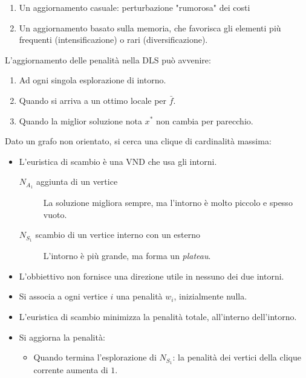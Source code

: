 \documentclass[\main/main.tex]{subfiles}
\begin{document}
\begin{multicols}{2}
\begin{observation}
    \begin{enumerate}
        \item Un aggiornamento casuale: perturbazione "rumorosa" dei costi
        \item Un aggiornamento basato sulla memoria, che favorisca gli elementi più frequenti (intensificazione) o rari (diversificazione).
    \end{enumerate}
\end{observation}
\begin{observation}
    L'aggiornamento delle penalità nella DLS può avvenire:
    \begin{enumerate}
        \item Ad ogni singola esplorazione di intorno.
        \item Quando si arriva a un ottimo locale per \(\bar{f}\).
        \item Quando la miglior soluzione nota \(x^*\) non cambia per parecchio.
    \end{enumerate}
\end{observation}
\begin{definition}
    Dato un grafo non orientato, si cerca una clique di cardinalità massima:
    \begin{itemize}
        \item L'euristica di scambio è una VND che usa gli intorni.
        \begin{description}
            \item[\(N_{A_1}\) aggiunta di un vertice] La soluzione migliora sempre, ma l'intorno è molto piccolo e spesso vuoto.
            \item[\(N_{S_1}\) scambio di un vertice interno con un esterno] L'intorno è più grande, ma forma un \textit{plateau}.
        \end{description}
        \item L'obbiettivo non fornisce una direzione utile in nessuno dei due intorni.
        \item Si associa a ogni vertice \(i\) una penalità \(w_i\), inizialmente nulla.
        \item L'euristica di scambio minimizza la penalità totale, all'interno dell'intorno.
        \item Si aggiorna la penalità:
        \begin{itemize}
            \item Quando termina l'esplorazione di \(N_{S_1}\): la penalità dei vertici della clique corrente aumenta di \(1\).

\end{itemize}
\end{itemize}
\end{definition}
\end{multicols}
\end{document}
